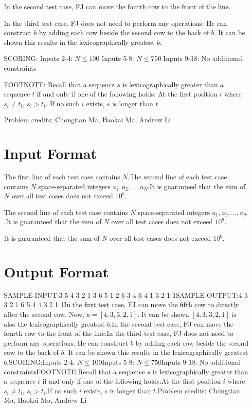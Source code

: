 \documentclass[12pt]{article}
\begin{document}
In the second test case, FJ can move the fourth cow to the front of the line.

In the third test case, FJ does not need to perform any operations. He can
construct $b$ by adding each cow beside the second cow to the back of $b$. It
can be shown this results in the lexicographically greatest $b$.

SCORING:
 Inputs 2-4: $N \leq 100$  Inputs 5-8: $N \leq 750$ 
Inputs 9-18: No additional constraints 

FOOTNOTE:
Recall that a sequence $s$ is lexicographically greater than a sequence $t$ if
and only if one of the following holds:  At the first position $i$ where
$s_i \neq t_i$, $s_i > t_i$.  If no such $i$ exists, $s$ is longer
than $t$.


Problem credits: Chongtian Ma, Haokai Ma, Andrew Li



\section*{Input Format}
The first line of each test case contains $N$.The second line of each test case contains $N$ space-separated integers
$a_1, a_2, \ldots, a_N$.It is guaranteed that the sum of $N$ over all test cases does not exceed $10^6$.

The second line of each test case contains $N$ space-separated integers
$a_1, a_2, \ldots, a_N$.It is guaranteed that the sum of $N$ over all test cases does not exceed $10^6$.

It is guaranteed that the sum of $N$ over all test cases does not exceed $10^6$.

\section*{Output Format}
SAMPLE INPUT:3
5
4 3 2 1 3
6
5 1 2 6 3 4
6
4 1 3 2 1 1SAMPLE OUTPUT:4 3 3 2 1
6 5 4
4 3 2 1 1In the first test case, FJ can move the fifth cow to directly after the second
cow. Now, $a = [4, 3, 3, 2, 1]$. It can be shown $[4, 3, 3, 2, 1]$ is also the
lexicographically greatest $b$.In the second test case, FJ can move the fourth cow to the front of the line.In the third test case, FJ does not need to perform any operations. He can
construct $b$ by adding each cow beside the second cow to the back of $b$. It
can be shown this results in the lexicographically greatest $b$.SCORING:Inputs 2-4: $N \leq 100$Inputs 5-8: $N \leq 750$Inputs 9-18: No additional constraintsFOOTNOTE:Recall that a sequence $s$ is lexicographically greater than a sequence $t$ if
and only if one of the following holds:At the first position $i$ where
$s_i \neq t_i$, $s_i > t_i$.If no such $i$ exists, $s$ is longer
than $t$.Problem credits: Chongtian Ma, Haokai Ma, Andrew Li
\end{document}
